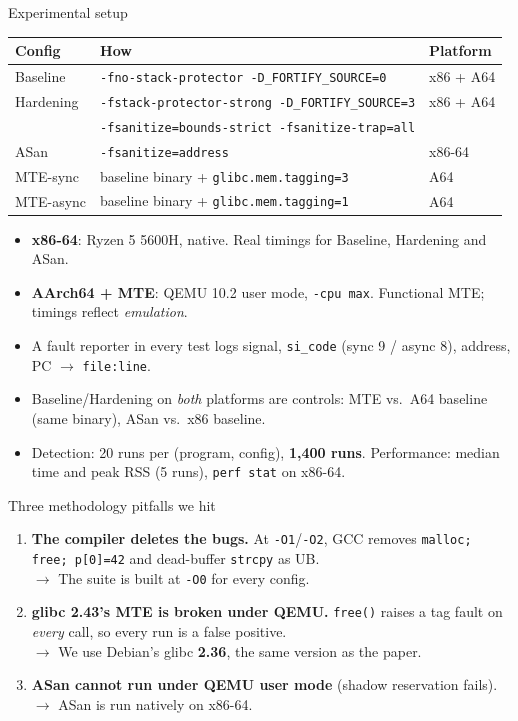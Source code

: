 \documentclass[aspectratio=169,11pt]{beamer}
\begin{document}
\begin{frame}{Experimental setup}
\footnotesize
\begin{tabular}{@{}lll@{}}
\toprule
Config & How & Platform\\
\midrule
Baseline & \texttt{-fno-stack-protector -D\_FORTIFY\_SOURCE=0} & x86 + A64\\
Hardening & \texttt{-fstack-protector-strong -D\_FORTIFY\_SOURCE=3} & x86 + A64\\
 & \texttt{-fsanitize=bounds-strict -fsanitize-trap=all} & \\
ASan & \texttt{-fsanitize=address} & x86-64\\
MTE-sync & baseline binary + \texttt{glibc.mem.tagging=3} & A64\\
MTE-async & baseline binary + \texttt{glibc.mem.tagging=1} & A64\\
\bottomrule
\end{tabular}
\vspace{0pt}
\begin{itemize}\itemsep2pt
\item \textbf{x86-64}: Ryzen 5 5600H, native. Real timings for Baseline, Hardening and ASan.
\item \textbf{AArch64 + MTE}: QEMU 10.2 user mode, \texttt{-cpu max}. Functional MTE; timings reflect \emph{emulation}.
\item A fault reporter in every test logs signal, \texttt{si\_code} (sync 9 / async 8), address, PC $\rightarrow$ \texttt{file:line}.
\item Baseline/Hardening on \emph{both} platforms are controls: MTE vs.\ A64 baseline (same binary), ASan vs.\ x86 baseline.
\item Detection: 20 runs per (program, config), \textbf{1{,}400 runs}. Performance: median time and peak RSS (5 runs), \texttt{perf stat} on x86-64.
\end{itemize}
\end{frame}

\begin{frame}{Three methodology pitfalls we hit}
\begin{enumerate}\itemsep8pt
\item \textbf{The compiler deletes the bugs.} At \texttt{-O1}/\texttt{-O2}, GCC removes \texttt{malloc; free; p[0]=42} and dead-buffer \texttt{strcpy} as UB.\\
\hspace{1em}$\rightarrow$ The suite is built at \texttt{-O0} for every config.
\item \textbf{glibc 2.43's MTE is broken under QEMU.} \texttt{free()} raises a tag fault on \emph{every} call, so every run is a false positive.\\
\hspace{1em}$\rightarrow$ We use Debian's glibc \textbf{2.36}, the same version as the paper.
\item \textbf{ASan cannot run under QEMU user mode} (shadow reservation fails).\\
\hspace{1em}$\rightarrow$ ASan is run natively on x86-64.
\end{enumerate}
\end{frame}
\end{document}
